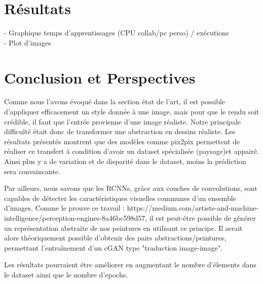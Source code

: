 \documentclass[a4paper, 12pt]{report}
\begin{document}
\chapter{Résultats}
- Graphique temps d'apprentissages (CPU collab/pc perso) / exécutions\\
- Plot d'images

\chapter{Conclusion et Perspectives\label{chap-conclusion}}

Comme nous l'avons évoqué dans la section état de l'art, il est possible d'appliquer efficacement un style donnée à une image, mais pour que le rendu soit crédible, il faut que l'entrée provienne d'une image réaliste. Notre principale difficulté était donc de transformer une abstraction en dessins réaliste. Les résultats présentés montrent que des modèles comme pix2pix permettent de réaliser ce transfert à condition d'avoir un dataset spécialisée (paysage)et appairé. Ainsi plus y a de variation et de disparité dans le dataset, moins la prédiction sera convaincante.

Par ailleurs, nous savons que les RCNNs, grâce aux couches de convolutions, sont capables de détecter les caractéristiques visuelles communes d'un ensemble d'images. Comme le prouve ce travail : https://medium.com/artists-and-machine-intelligence/perception-engines-8a46bc598d57, il est peut-être possible de générer un représentation abstraite de nos peintures en utilisant ce principe. Il serait alors théoriquement possible d'obtenir des pairs abstractions/peintures, permettant l'entraînement d'un cGAN type "traduction image-image". 

Les résultats pourraient être améliorer en augmentant le nombre d'élements dans le dataset ainsi que le nombre d'epochs.




\end{document}
